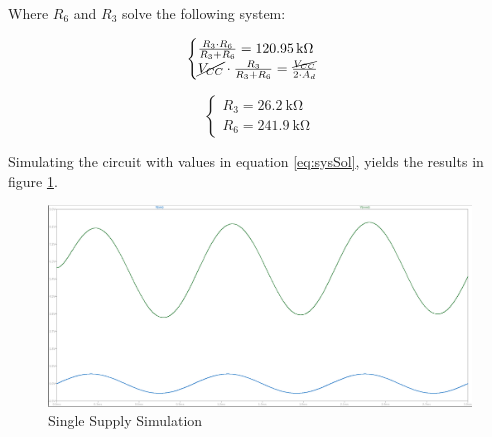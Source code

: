 Where $R_6$ and $R_3$ solve the following system:

\begin{equation}
    \begin{cases}
        \frac{R_3 \cdot R_6}{R_3 + R_6} = \SI{120,95}{\kilo\ohm}\\
        \cancel{V_{CC}}\cdot\frac{R_3}{R_3 + R_6} = \frac{\cancel{V_{CC}}}{2\cdot A_d} 
    \end{cases}
\end{equation}

\begin{equation}
    \begin{cases}
        R_3 = \SI{26.2}{\kilo\ohm} \\
        R_6 = \SI{241.9}{\kilo\ohm}
    \end{cases}
    \label{eq:sysSol}
\end{equation}

Simulating the circuit with values in equation \ref{eq:sysSol}, yields the results in figure \ref{fig:SingSupSim}.

\begin{figure}[H]
    \centering
    \includegraphics*[scale = 0.25]{Images/SingSupSim.png}
    \caption{Single Supply Simulation}
    \label{fig:SingSupSim}
\end{figure}
